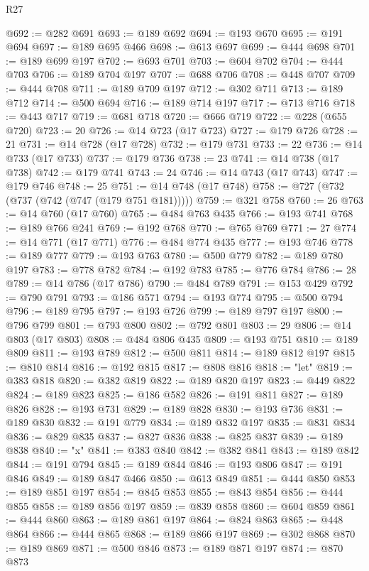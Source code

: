\begin{lexlean}{R27}
\begin{coremodule}
@692 := @282 @691
@693 := @189 @692
@694 := @193 @670
@695 := @191 @694
@697 := @189 @695 @466
@698 := @613 @697
@699 := @444 @698
@701 := @189 @699 @197
@702 := @693 @701
@703 := @604 @702
@704 := @444 @703
@706 := @189 @704 @197
@707 := @688 @706
@708 := @448 @707
@709 := @444 @708
@711 := @189 @709 @197
@712 := @302 @711
@713 := @189 @712
@714 := @500 @694
@716 := @189 @714 @197
@717 := @713 @716
@718 := @443 @717
@719 := @681 @718
@720 := @666 @719
@722 := @228 (@655 @720)
@723 := 20
@726 := @14 @723 (@17 @723)
@727 := @179 @726
@728 := 21
@731 := @14 @728 (@17 @728)
@732 := @179 @731
@733 := 22
@736 := @14 @733 (@17 @733)
@737 := @179 @736
@738 := 23
@741 := @14 @738 (@17 @738)
@742 := @179 @741
@743 := 24
@746 := @14 @743 (@17 @743)
@747 := @179 @746
@748 := 25
@751 := @14 @748 (@17 @748)
@758 := @727 (@732 (@737 (@742 (@747 (@179 @751 @181)))))
@759 := @321 @758
@760 := 26
@763 := @14 @760 (@17 @760)
@765 := @484 @763 @435
@766 := @193 @741
@768 := @189 @766 @241
@769 := @192 @768
@770 := @765 @769
@771 := 27
@774 := @14 @771 (@17 @771)
@776 := @484 @774 @435
@777 := @193 @746
@778 := @189 @777
@779 := @193 @763
@780 := @500 @779
@782 := @189 @780 @197
@783 := @778 @782
@784 := @192 @783
@785 := @776 @784
@786 := 28
@789 := @14 @786 (@17 @786)
@790 := @484 @789
@791 := @153 @429
@792 := @790 @791
@793 := @186 @571
@794 := @193 @774
@795 := @500 @794
@796 := @189 @795
@797 := @193 @726
@799 := @189 @797 @197
@800 := @796 @799
@801 := @793 @800
@802 := @792 @801
@803 := 29
@806 := @14 @803 (@17 @803)
@808 := @484 @806 @435
@809 := @193 @751
@810 := @189 @809
@811 := @193 @789
@812 := @500 @811
@814 := @189 @812 @197
@815 := @810 @814
@816 := @192 @815
@817 := @808 @816
@818 := "let"
@819 := @383 @818
@820 := @382 @819
@822 := @189 @820 @197
@823 := @449 @822
@824 := @189 @823
@825 := @186 @582
@826 := @191 @811
@827 := @189 @826
@828 := @193 @731
@829 := @189 @828
@830 := @193 @736
@831 := @189 @830
@832 := @191 @779
@834 := @189 @832 @197
@835 := @831 @834
@836 := @829 @835
@837 := @827 @836
@838 := @825 @837
@839 := @189 @838
@840 := "x"
@841 := @383 @840
@842 := @382 @841
@843 := @189 @842
@844 := @191 @794
@845 := @189 @844
@846 := @193 @806
@847 := @191 @846
@849 := @189 @847 @466
@850 := @613 @849
@851 := @444 @850
@853 := @189 @851 @197
@854 := @845 @853
@855 := @843 @854
@856 := @444 @855
@858 := @189 @856 @197
@859 := @839 @858
@860 := @604 @859
@861 := @444 @860
@863 := @189 @861 @197
@864 := @824 @863
@865 := @448 @864
@866 := @444 @865
@868 := @189 @866 @197
@869 := @302 @868
@870 := @189 @869
@871 := @500 @846
@873 := @189 @871 @197
@874 := @870 @873

\end{coremodule}
\end{lexlean}
